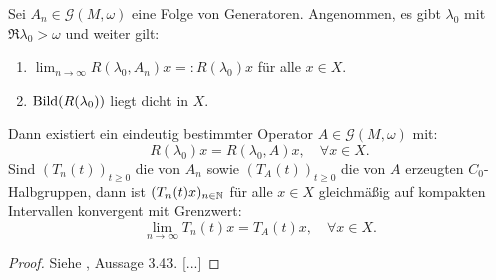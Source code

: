 \begin{fsatz}\label{Trotter-Kato}
Sei $A_n\in \mathcal G(M,\omega)$ eine Folge von Generatoren. Angenommen, es gibt $\lambda_0$ mit $\mathfrak R\lambda_0 >\omega$ und weiter  gilt:
\begin{enumerate}
\item $\lim_{n\to\infty}R(\lambda_0, A_n)x =:R(\lambda_0)x$ für alle $x\in X$.
\item $\textnormal{Bild}(R(\lambda_0))$ liegt dicht in $X$.
\end{enumerate}
Dann existiert ein eindeutig bestimmter Operator $A\in\mathcal G(M, \omega)$ mit:
\begin{equation*}
R(\lambda_0)x=R(\lambda_0, A)x,\quad\forall x\in X.
\end{equation*}
Sind $(T_n(t))_{t\geq0}$ die von $A_n$ sowie $(T_A(t))_{t\geq0}$ die von $A$ erzeugten $C_0$-Halbgruppen, dann ist $(T_n(t)x)_{n\in\mathbb{N}}$ für alle $x\in X$ gleichmäßig auf kompakten Intervallen konvergent mit Grenzwert:
\begin{equation*}
\lim_{n\to\infty}T_n(t)x=T_A(t)x,\quad\forall x\in X.
\end{equation*}
\end{fsatz}

\begin{proof}
Siehe \cite{banasiak_arlotti_2006}, Aussage  3.43. [...]
\end{proof}









